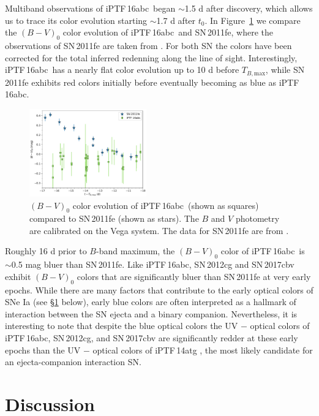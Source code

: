\documentclass[twocolumn]{aastex61}
\newcommand{\abc}{iPTF\,16abc}
\begin{document}
Multiband observations of \abc\ began $\sim$1.5 d after discovery, which allows us to trace its color evolution starting $\sim$1.7 d after $t_0$. In Figure~\ref{fig:B-Vcolors} we compare the $(B - V)_0$ color evolution of \abc\ and SN\,2011fe, where the observations of SN\,2011fe are taken from \citet{2016ApJ...820...67Z}. For both SN the colors have been corrected for the total inferred redenning along the line of sight. Interestingly, \abc\ has a nearly flat color evolution up to 10 d before $T_{B,\mathrm{max}}$, while SN\,2011fe exhibits red colors initially before eventually becoming as blue as \abc. 

\begin{figure}[]
  \centering
  \includegraphics[width=0.45\textwidth]{16abc_11fe_colors.pdf}
  \caption{$(B - V)_0$ color evolution of \abc\ (shown as squares) 
    compared to SN\,2011fe (shown as stars). The $B$ and $V$ 
    photometry are calibrated on the Vega system. The data for 
    SN\,2011fe are from \citet{2016ApJ...820...67Z}.}
  \label{fig:B-Vcolors}
\end{figure}

Roughly 16 d prior to $B$-band maximum, the $(B - V)_0$ color of \abc\ is $\sim$0.5 mag bluer than SN\,2011fe. Like \abc, SN\,2012cg \citep{2016ApJ...820...92M} and SN\,2017cbv \citep{2017arXiv170608990H} exhibit $(B - V)_0$ colors that are significantly bluer than SN\,2011fe at very early epochs. While there are many factors that contribute to the early optical colors of SNe Ia (see \S\ref{sec:lc_energy} below), early blue colors are often interpreted as a hallmark of interaction between the SN ejecta and a binary companion. Nevertheless, it is interesting to note that despite the blue optical colors the UV $-$ optical colors of \abc, SN\,2012cg, and SN\,2017cbv are significantly redder at these early epochs than the UV $-$ optical colors of iPTF\,14atg \citep{2015Natur.521..328C}, the most likely candidate for an ejecta-companion interaction SN. 

\section{Discussion}
\label{sec:lc_energy}
\end{document}
